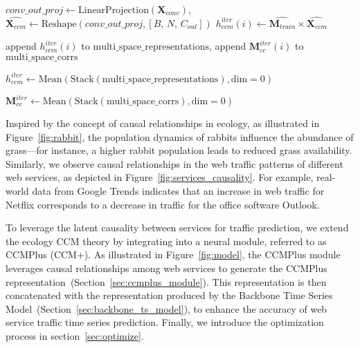 \begin{algorithm*}[t]
\begin{algorithmic}[1]
        \EndIf

        \State $conv\_out\_proj \gets \text{LinearProjection}(\mathbf{X}_{conv})$, $ \widehat{\mathbf{X}_{ccm}} \gets \text{Reshape}(conv\_out\_proj, [B,\, N,\, C_{out} ])$
        \State
        $ h_{ccm}^{iter}(i) \gets \widehat{\mathbf{M}_{train}} \times \widehat{\mathbf{X}_{ccm}}$
        

        \State append $h_{ccm}^{iter}(i)$ to $\text{multi\_space\_representations}$, append $\mathbf{M}_{cc}^{iter}(i)$ to $\text{multi\_space\_corrs}$
    \EndFor
    
    
    \State $h_{ccm}^{iter} \gets \text{Mean}(\text{Stack}(\text{multi\_space\_representations}), \text{dim}=0)$
    
    \State $\mathbf{M}_{cc}^{iter} \gets \text{Mean}(\text{Stack}(\text{multi\_space\_corrs}), \text{dim}=0)$
    
\EndFor
\end{algorithmic}
\end{algorithm*}
Inspired by the concept of causal relationships in ecology, as illustrated in Figure~\ref{fig:rabbit}, the population dynamics of rabbits influence the abundance of grass—for instance, a higher rabbit population leads to reduced grass availability. Similarly, we observe causal relationships in the web traffic patterns of different web services, as depicted in Figure~\ref{fig:services_causality}. For example, real-world data from Google Trends indicates that an increase in web traffic for Netflix corresponds to a decrease in traffic for the office software Outlook.

To leverage the latent causality between services for traffic prediction, we extend the ecology CCM theory by integrating into a neural module, referred to as CCMPlus (CCM+). 
As illustrated in Figure~\ref{fig:model}, the CCMPlus module leverages causal relationships among web services to generate the CCMPlus representation~(Section~\ref{sec:ccmplus_module}). This representation is then concatenated with the representation produced by the Backbone Time Series Model~(Section~\ref{sec:backbone_ts_model}), to enhance the accuracy of web service traffic time series prediction.
Finally, we introduce the optimization process in section~\ref{sec:optimize}.


